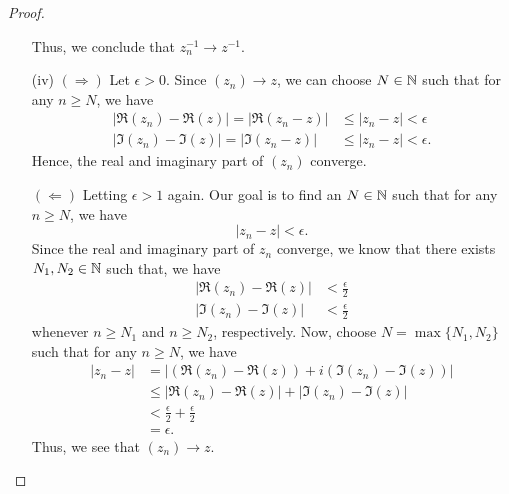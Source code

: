 \documentclass[a4paper]{report}
\begin{document}
\begin{proof}
\begin{enumerate}
    Thus, we conclude that \( {z}_{n}^{-1} \to z^{-1} \).
\item[(iv)] \( (\Longrightarrow) \) Let \( \epsilon > 0  \). Since \( ({z}_{n}) \to z  \), we can choose \( N \in \mathbb{N}  \) such that for any \( n \geq N  \), we have   
    \begin{align*}
        | \Re({z}_{n}) - \Re(z)  | =  | \Re({z}_{n} - z) | &\leq | {z}_{n} - z | < \epsilon    \\
        | \Im({z}_{n}) - \Im(z) | = | \Im({z}_{n} - z) | &\leq | {z}_{n} - z  | < \epsilon.  
    \end{align*}
    Hence, the real and imaginary part of \( ({z}_{n}) \) converge.

    \( (\Longleftarrow) \) Letting \( \epsilon > 1  \) again. Our goal is to find an \( N \in \mathbb{N}  \) such that for any \( n \geq N  \), we have 
    \[ | {z}_{n} - z  |  < \epsilon. \]
    Since the real and imaginary part of \( {z}_{n} \) converge, we know that there exists \( {N}_{1}, {N}_{2} \in \mathbb{N}  \) such that, we have  
    \begin{align*}
        | \Re({z}_{n}) - \Re(z) |  &< \frac{ \epsilon }{ 2 } \tag{1}  \\
        | \Im({z}_{n}) - \Im(z) | &< \frac{ \epsilon }{ 2 } \tag{2}
    \end{align*}
 whenever \( n \geq {N}_{1} \) and \( n \geq {N}_{2} \), respectively. Now, choose \( N = \max \{ {N}_{1}, {N}_{2} \}  \) such that for any \( n \geq N  \), we have
 \begin{align*}
     | {z}_{n} - z | &= | (\Re({z}_{n}) - \Re(z) ) + i(\Im({z}_{n}) - \Im(z))  |  \\
                     &\leq | \Re({z}_{n}) - \Re(z) |  +  | \Im({z}_{n}) - \Im(z) | \tag{\( | i |  = 1  \)}  \\
                     &< \frac{ \epsilon }{ 2 }  + \frac{ \epsilon }{ 2 }  \\
                     &= \epsilon.
 \end{align*}
 Thus, we see that \( ({z}_{n}) \to z  \).
\end{enumerate}
\end{proof}
\end{document}
